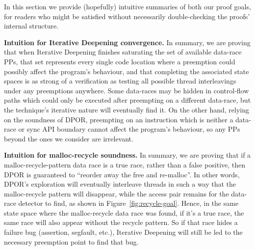 In this section we provide (hopefully) intuitive summaries of both our proof goals,
for readers who might be satisfied without necessarily double-checking the proofs' internal structure.

{\bf Intuition for Iterative Deepening convergence.}
In summary, we are proving that when Iterative Deepening finishes saturating the set of available data-race PPs,
that set represents every single code location where a preemption could possibly affect the program's behaviour,
and that completing the associated state spaces is as strong of a verification as testing all possible thread interleavings under any preemptions anywhere.
Some data-races may be hidden in control-flow paths which could only be executed after preempting on a different data-race,
but the technique's iterative nature will eventually find it.
On the other hand, relying on the soundness of DPOR, preempting on an instruction which is neither a data-race or sync API boundary cannot affect the program's behaviour,
so any PPs beyond the ones we consider are irrelevant.

{\bf Intuition for malloc-recycle soundness.}
In summary, we are proving that if a malloc-recycle-pattern data race is a true race, rather than a false positive,
then DPOR is guaranteed to ``reorder away the free and re-malloc''.
In other words, DPOR's exploration will eventually interleave threads in such a way that the malloc-recycle pattern will disappear,
while the access pair remains for the data-race detector to find, as shown in Figure~\ref{fig:recycle-goal}.
Hence, in the same state space where the malloc-recycle data race was found, if it's a true race, the same race will also appear without the recycle pattern.
So if that race hides a failure bug (assertion, segfault, etc.), Iterative Deepening will still be led to the necessary preemption point to find that bug.
